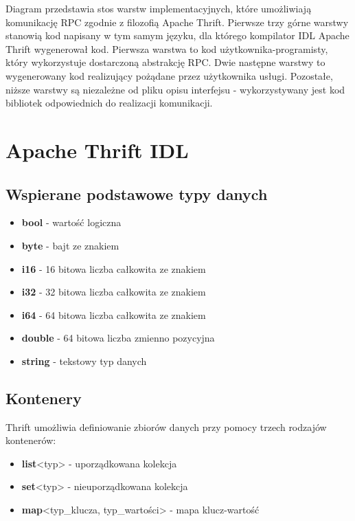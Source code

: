 \vspace{5mm}
Diagram przedstawia stos warstw implementacyjnych, które umożliwiają
komunikację RPC zgodnie z filozofią Apache Thrift.  Pierwsze trzy górne warstwy
stanowią kod napisany w tym samym języku, dla którego kompilator IDL Apache
Thrift wygenerował kod. Pierwsza warstwa to kod użytkownika-programisty, który
wykorzystuje dostarczoną abstrakcję RPC. Dwie następne warstwy to wygenerowany
kod realizujący pożądane przez użytkownika usługi. Pozostałe, niższe warstwy są
niezależne od pliku opisu interfejsu - wykorzystywany jest kod bibliotek
odpowiednich do realizacji komunikacji.

\section[Apache Thrift IDL][Apache Thrift IDL]{Apache Thrift IDL}
\hspace*{-\parindent}%
\begin{minipage}{\linewidth}
\subsection[Wspierane podstawowe typy danych][Wspierane podstawowe typy
danych]{Wspierane podstawowe typy danych}
\begin{itemize}
	\item \textbf{bool} - wartość logiczna 
	\item \textbf{byte} - bajt ze znakiem
	\item \textbf{i16} - 16 bitowa liczba całkowita ze znakiem
	\item \textbf{i32} - 32 bitowa liczba całkowita ze znakiem
	\item \textbf{i64} - 64 bitowa liczba całkowita ze znakiem
	\item \textbf{double} - 64 bitowa liczba zmienno pozycyjna
	\item \textbf{string} - tekstowy typ danych
\end{itemize}
\end{minipage}

\subsection[Kontenery][Kontenery]{Kontenery}
\hspace*{-\parindent}%
\begin{minipage}{\linewidth}
Thrift umożliwia definiowanie zbiorów danych przy pomocy trzech rodzajów
kontenerów:
\begin{itemize}
	\item \textbf{list}<typ> - uporządkowana kolekcja 
	\item \textbf{set}<typ> - nieuporządkowana kolekcja
	\item \textbf{map}<typ\_klucza, typ\_wartości>  - mapa
	klucz-wartość
\end{itemize}
\end{minipage}

